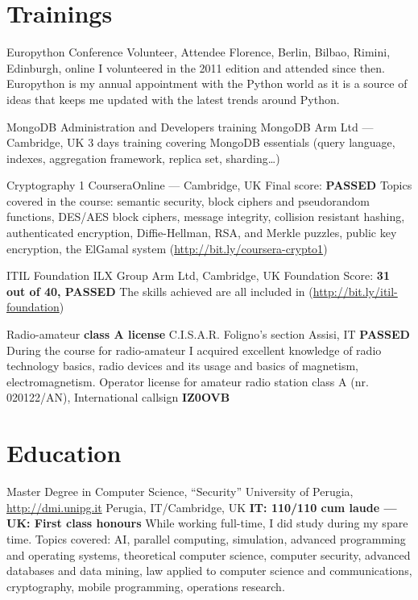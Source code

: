 \documentclass[10pt,a4paper,sans]{moderncv}
\begin{document}
\section{Trainings}
    {Europython Conference}
    {Volunteer, Attendee}
    {Florence, Berlin, Bilbao, Rimini, Edinburgh, online}
    {}
    {I volunteered in the 2011 edition and attended since then.
    Europython is my annual appointment with the Python world as it is
    a source of ideas that keeps me updated with the latest trends around
    Python.}

    {MongoDB Administration and Developers training}
    {MongoDB}
    {Arm Ltd --- Cambridge, UK}{}
    {3 days training covering MongoDB essentials (query language, indexes,
    aggregation framework, replica set, sharding\dots)}

    {Cryptography 1}
    {Coursera}{Online --- Cambridge, UK}
    {Final score: \textbf{PASSED}}
    {Topics covered in the course: semantic security, block ciphers and
    pseudorandom functions, DES/AES block ciphers, message integrity,
    collision resistant hashing, authenticated encryption, Diffie-Hellman, RSA,
    and Merkle puzzles, public key encryption, the ElGamal system
    (\url{http://bit.ly/coursera-crypto1})}

    {ITIL Foundation}
    {ILX Group}{
    Arm Ltd, Cambridge, UK}
    {Foundation Score: \textbf{31 out of 40, PASSED}}
    {The skills achieved are all included in
    (\url{http://bit.ly/itil-foundation})}

    {Radio-amateur \textbf{class A license}}
    {C.I.S.A.R. Foligno's section}
    {Assisi, IT}
    {\textbf{PASSED}}
    {During the course for radio-amateur I acquired excellent knowledge of
    radio technology basics, radio devices and its usage and basics of
    magnetism, electromagnetism. Operator license for amateur radio station
    class A (nr. 020122/AN), International callsign \textbf{IZ0OVB}}

\section{Education}
    {Master Degree in Computer Science, ``Security''}
    {University of Perugia, \url{http://dmi.unipg.it}}
    {Perugia, IT/Cambridge, UK}
    {\textbf{IT\@: 110/110 cum laude --- UK\@: First class honours}}
    {While working full-time, I did study during my spare time. Topics covered:
    AI, parallel computing, simulation, advanced programming and operating
    systems, theoretical computer science, computer security, advanced
    databases and data mining, law applied to computer science and
    communications, cryptography, mobile programming, operations research.}
\end{document}
